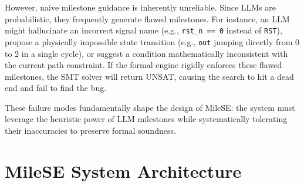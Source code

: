 \documentclass[conference]{IEEEtran}
\begin{document}
However, naive milestone guidance is inherently unreliable. Since LLMs are probabilistic, they frequently generate flawed milestones. For instance, an LLM might hallucinate an incorrect signal name (e.g., \texttt{rst\_n == 0} instead of \texttt{RST}), propose a physically impossible state transition (e.g., \texttt{out} jumping directly from 0 to 2 in a single cycle), or suggest a condition mathematically inconsistent with the current path constraint. If the formal engine rigidly enforces these flawed milestones, the SMT solver will return UNSAT, causing the search to hit a dead end and fail to find the bug. 

These failure modes fundamentally shape the design of MileSE: the system must leverage the heuristic power of LLM milestones while systematically tolerating their inaccuracies to preserve formal soundness.

\section{MileSE System Architecture}
\label{sec:architecture}
\end{document}
